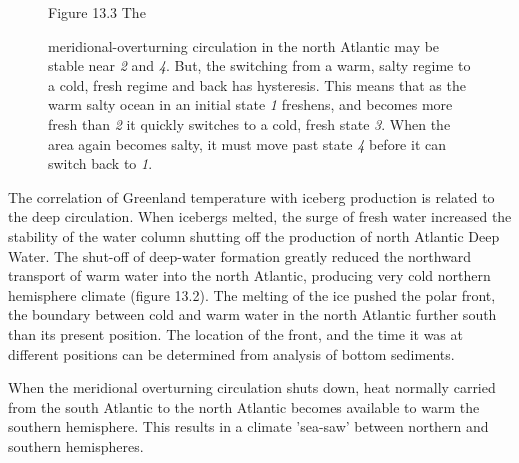 \begin{enumerate}
\begin{figure}[b!]
\vspace{-2ex}
\footnotesize
Figure 13.3 The \rule{0mm}{3ex}meridional-overturning
circulation in the north
Atlantic may be stable near \textit{2} and \textit{4}. But, the
switching from a warm, salty regime to a cold, fresh regime and back
has hysteresis. This means that as the warm salty ocean in an initial
state \textit{1} freshens, and becomes more fresh than \textit{2} it
quickly switches to a cold, fresh state \textit{3}. When the area
again becomes salty, it must move past state \textit{4} before it can
switch back to \textit{1}.
\label{fig:hysteresis}
\end{figure}

\vitem The correlation of Greenland temperature with iceberg
production is related to the deep circulation. When icebergs melted,
the surge of fresh water increased the stability of the water column
shutting off the production of north Atlantic Deep Water. The shut-off of deep-water formation greatly
reduced the northward transport of
warm water into the north Atlantic, producing very cold northern
hemisphere climate (figure 13.2). The melting of the ice pushed the
polar front, the boundary between cold and warm water in the north
Atlantic further south than its present position. The location of the
front, and the time it was at different positions can be determined
from analysis of bottom sediments.

\vitem When the meridional overturning
circulation shuts down, heat
normally carried from the south Atlantic to the north Atlantic becomes
available to warm the southern hemisphere. This results in a climate
'sea-saw' between northern and southern hemispheres.


\end{enumerate}
